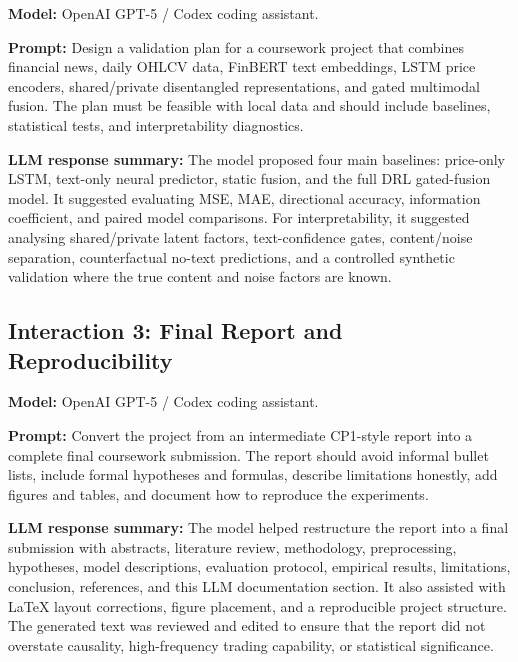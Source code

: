 \documentclass[12pt, a4paper]{article}
\begin{document}
\textbf{Model:} OpenAI GPT-5 / Codex coding assistant.

\textbf{Prompt:} Design a validation plan for a coursework project that combines financial news, daily OHLCV data, FinBERT text embeddings, LSTM price encoders, shared/private disentangled representations, and gated multimodal fusion. The plan must be feasible with local data and should include baselines, statistical tests, and interpretability diagnostics.

\textbf{LLM response summary:} The model proposed four main baselines: price-only LSTM, text-only neural predictor, static fusion, and the full DRL gated-fusion model. It suggested evaluating MSE, MAE, directional accuracy, information coefficient, and paired model comparisons. For interpretability, it suggested analysing shared/private latent factors, text-confidence gates, content/noise separation, counterfactual no-text predictions, and a controlled synthetic validation where the true content and noise factors are known.

\subsection*{Interaction 3: Final Report and Reproducibility}

\textbf{Model:} OpenAI GPT-5 / Codex coding assistant.

\textbf{Prompt:} Convert the project from an intermediate CP1-style report into a complete final coursework submission. The report should avoid informal bullet lists, include formal hypotheses and formulas, describe limitations honestly, add figures and tables, and document how to reproduce the experiments.

\textbf{LLM response summary:} The model helped restructure the report into a final submission with abstracts, literature review, methodology, preprocessing, hypotheses, model descriptions, evaluation protocol, empirical results, limitations, conclusion, references, and this LLM documentation section. It also assisted with LaTeX layout corrections, figure placement, and a reproducible project structure. The generated text was reviewed and edited to ensure that the report did not overstate causality, high-frequency trading capability, or statistical significance.
\end{document}
